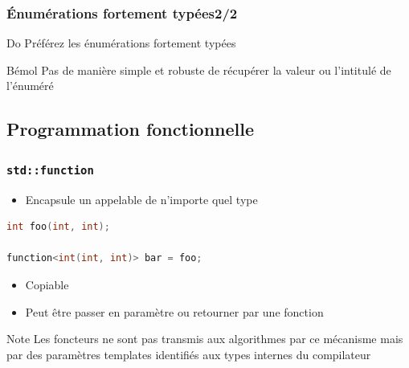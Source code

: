 \documentclass[C++.tex]{subfiles}
\begin{document}
\begin{frame}[fragile]
	\frametitle{Énumérations fortement typées\titlehfill{}2/2}
	\begin{exampleblock}{Do}
		Préférez les énumérations fortement typées
	\end{exampleblock}

	\begin{block}{Bémol}
		Pas de manière simple et robuste de récupérer la valeur ou l'intitulé de l'énuméré

	\end{block}
\end{frame}

\subsection*{Programmation fonctionnelle}
\begin{frame}[fragile]
	\frametitle{\lstinline|std::function|}

	\begin{itemize}
		\item Encapsule un appelable de n'importe quel type
	\end{itemize}

	\begin{lstlisting}[language=C++]
int foo(int, int);

function<int(int, int)> bar = foo;\end{lstlisting}

	\begin{itemize}
		\item Copiable
		\item Peut être passer en paramètre ou retourner par une fonction
	\end{itemize}

	\begin{block}{Note}
		Les foncteurs ne sont pas transmis aux algorithmes par ce mécanisme mais par des paramètres templates identifiés aux types internes du compilateur
	
	\end{block}
\end{frame}
\end{document}
